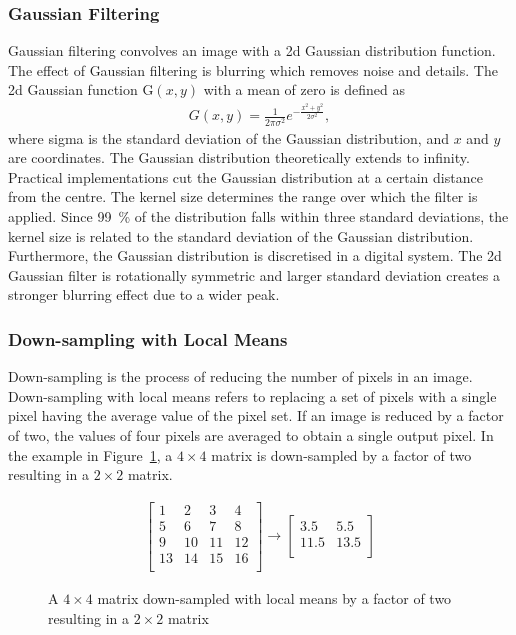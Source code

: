 \subsubsection{Gaussian Filtering} \label{sec:t_gauss}
Gaussian filtering convolves an image with a \gls{2d} Gaussian distribution function. The effect of Gaussian filtering is blurring which removes noise and details. The \gls{2d} Gaussian function \gls{G}$(x,y)$ with a mean of zero is defined as
\begin{align}
    G(x,y) = \frac{1}{2\pi \sigma^{2}}e^{-\frac{x^2+y^2}{2\sigma^2}}, \label{eq:gauss_2d}
\end{align}
where \gls{sigma} is the standard deviation of the Gaussian distribution, and $x$ and $y$ are coordinates. The Gaussian distribution theoretically extends to infinity. Practical implementations cut the Gaussian distribution at a certain distance from the centre. The kernel size determines the range over which the filter is applied. Since \SI{99}{\percent} of the distribution falls within three standard deviations, the kernel size is related to the standard deviation of the Gaussian distribution. Furthermore, the Gaussian distribution is discretised in a digital system. The \gls{2d} Gaussian filter is rotationally symmetric and larger standard deviation creates a stronger blurring effect due to a wider peak.

\subsubsection{Down-sampling with Local Means} \label{sec:t_downsample}
Down-sampling is the process of reducing the number of pixels in an image. Down-sampling with local means refers to replacing a set of pixels with a single pixel having the average value of the pixel set. If an image is reduced by a factor of two, the values of four pixels are averaged to obtain a single output pixel. In the example in Figure~\ref{fig:downsample_example}, a $4\times4$ matrix is down-sampled by a factor of two resulting in a $2\times2$ matrix.
\begin{figure}[htb]
    \begin{align*}
        \begin{bmatrix}
            1  & 2  & 3  & 4\\
            5  & 6  & 7  & 8\\
            9  & 10 & 11 & 12\\
            13 & 14 & 15 & 16\\
        \end{bmatrix} 
        \rightarrow 
        \begin{bmatrix}
            3.5  & 5.5\\
            11.5 & 13.5\\ 
        \end{bmatrix}
    \end{align*}
    \caption{A $4\times4$ matrix down-sampled with local means by a factor of two resulting in a $2\times2$ matrix}
    \label{fig:downsample_example}
\end{figure}
